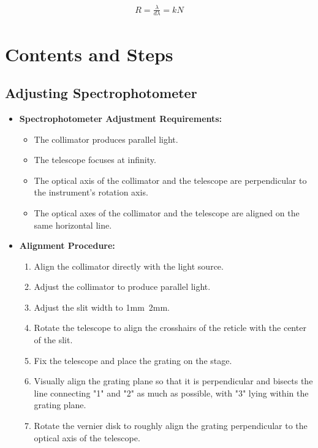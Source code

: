 \documentclass[UTF8]{article}
\begin{document}
     \begin{eqnarray}
     R = \frac{\lambda}{d\lambda} = kN
     \end{eqnarray}  
         
	\section{Contents and Steps}
    \subsection{Adjusting Spectrophotometer}
    \begin{itemize}
      \item \textbf{Spectrophotometer Adjustment Requirements:}
        \begin{itemize}
          \item The collimator produces parallel light.
          \item The telescope focuses at infinity.
          \item The optical axis of the collimator and the telescope are perpendicular to the instrument's rotation axis.
          \item The optical axes of the collimator and the telescope are aligned on the same horizontal line.
        \end{itemize}
        
      \item \textbf{Alignment Procedure:}
        \begin{enumerate}
          \item Align the collimator directly with the light source.
          \item Adjust the collimator to produce parallel light.
          \item Adjust the slit width to 1mm~2mm.
          \item Rotate the telescope to align the crosshairs of the reticle with the center of the slit.
          \item Fix the telescope and place the grating on the stage.
          \item Visually align the grating plane so that it is perpendicular and bisects the line connecting "1" and "2" as much as possible, with "3" lying within the grating plane.
          \item Rotate the vernier disk to roughly align the grating perpendicular to the optical axis of the telescope.
        \end{enumerate}
        

\end{itemize}
\end{document}
